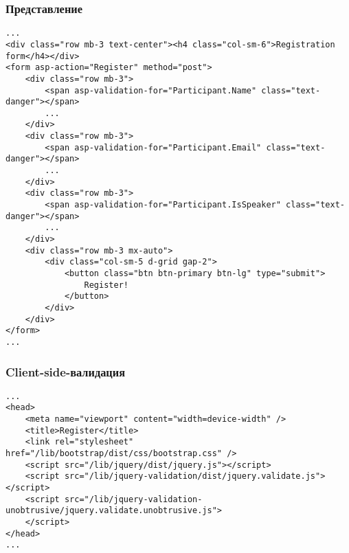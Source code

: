 \documentclass{../../slides-style}
\begin{document}
    \begin{frame}[fragile]
        \frametitle{Представление}
        \begin{ssmall}
            \begin{verbatim}
...
<div class="row mb-3 text-center"><h4 class="col-sm-6">Registration form</h4></div>
<form asp-action="Register" method="post">
    <div class="row mb-3">
        <span asp-validation-for="Participant.Name" class="text-danger"></span>
        ...
    </div>
    <div class="row mb-3">
        <span asp-validation-for="Participant.Email" class="text-danger"></span>
        ...
    </div>
    <div class="row mb-3">
        <span asp-validation-for="Participant.IsSpeaker" class="text-danger"></span>
        ...
    </div>
    <div class="row mb-3 mx-auto">
        <div class="col-sm-5 d-grid gap-2">
            <button class="btn btn-primary btn-lg" type="submit">
                Register!
            </button>
        </div>
    </div>
</form>
...
            \end{verbatim}
        \end{ssmall}
    \end{frame}

    \begin{frame}[fragile]
        \frametitle{Client-side-валидация}
        \begin{scriptsize}
            \begin{verbatim}
...
<head>
    <meta name="viewport" content="width=device-width" />
    <title>Register</title>
    <link rel="stylesheet" href="/lib/bootstrap/dist/css/bootstrap.css" />
    <script src="/lib/jquery/dist/jquery.js"></script>
    <script src="/lib/jquery-validation/dist/jquery.validate.js"></script>
    <script src="/lib/jquery-validation-unobtrusive/jquery.validate.unobtrusive.js">
    </script>
</head>
...
            \end{verbatim}
        \end{scriptsize}
    \end{frame}
\end{document}
